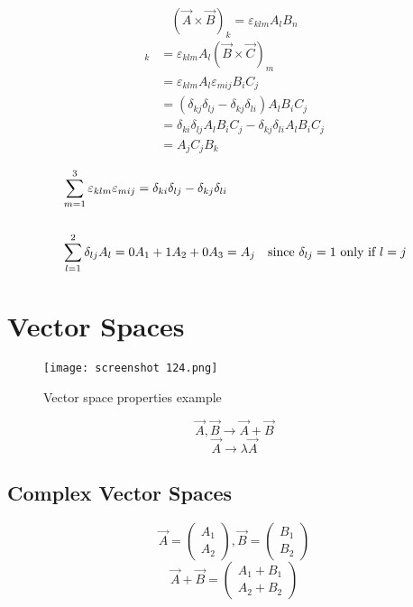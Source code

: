 \documentclass[svgnames]{article}   	%
\begin{document}
\[
  (\vec{A} \times \vec{B})_k = \varepsilon_{klm} A_l B_n 
\]
\begin{align*}
  [\vec{A} \times (\vec{B} \times \vec{C})]_k &= \varepsilon_{klm} A_l (\vec{B}
  \times \vec{C})_m \\
                                              &= \varepsilon_{klm} A_l
                                              \varepsilon_{mij} B_iC_j \\
                                              &= (\delta_{kj} \delta_{lj}
                                              - \delta_{kj}\delta_{li})A_lB_iC_j
                                              \\
                                              &= \delta_{ki}\delta_{lj}A_l B_i
                                              C_j - \delta_{kj} \delta_{li}
                                              A_lB_iC_j \\
                                              &= A_j C_jB_k
\end{align*}

\begin{align*}
  &\sum_{m=1}^{3} \varepsilon_{klm} \varepsilon_{mij} = \delta_{ki} \delta_{lj}
  - \delta_{kj} \delta_{li} \\\\
  &\sum_{l=1}^{2} \delta_{lj}A_l = 0A_1 + 1A_2 + 0A_3 = A_j  \hspace{10px}
  \text{since $\delta_{lj} =1$ only if $l=j$} 
\end{align*}

\section{Vector Spaces}

\begin{figure}[H]
  \centering
    \texttt{[image: screenshot 124.png]}
    \caption{Vector space properties example}
\end{figure}


\[
  \vec{A}, \vec{B} \rightarrow \vec{A} + \vec{B} 
\]
\[
  \vec{A} \rightarrow \lambda \vec{A}
\]
\subsection{Complex Vector Spaces}

\[
  \vec{A} = \begin{pmatrix} A_1 \\ A_2 \end{pmatrix}, \vec{B} = \begin{pmatrix}
B_1 \\ B_2 \end{pmatrix} 
\]
\[
  \vec{A} + \vec{B} = \begin{pmatrix} 
  A_1 + B_1 \\
  A_2 + B_2 
  \end{pmatrix} 
\]
\end{document}
